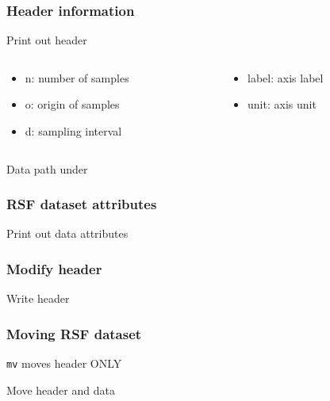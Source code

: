 \begin{frame}
  \frametitle{Header information}
 
  \begin{block}{Print out header}
  \end{block}
  
  \begin{columns}[t]
    \begin{column}[T]{.5\textwidth}
      \begin{itemize}
      \item n: number of samples
      \item o: origin of samples
      \item d: sampling interval
      \end{itemize}
    \end{column}
    \begin{column}[T]{.5\textwidth}
      \begin{itemize}
      \item label: axis label
      \item unit: axis unit
      \end{itemize} 
    \end{column}
  \end{columns}
  
  \pause
  \begin{block}{}
    Data path under 
  \end{block}
  
\end{frame}

\begin{frame}
  \frametitle{RSF dataset attributes}

  \begin{block}{Print out data attributes}
  \end{block}
  
\end{frame}

\begin{frame}
  \frametitle{Modify header}
  
  \begin{block}{Write header}
  \end{block}
  
\end{frame}

\begin{frame}
  \frametitle{Moving RSF dataset}

  \texttt{mv} moves header ONLY
  
  
  \pause
  \begin{block}{Move header and data}
  \end{block}
  
\end{frame}

